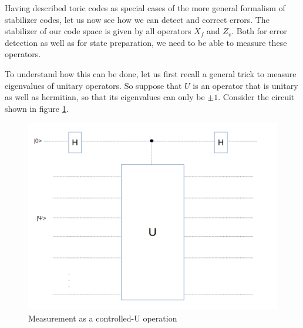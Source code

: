 \documentclass[a4paper, draft]{article}
\theoremstyle{own}
\theoremstyle{remark}
\begin{document}
Having described toric codes as special cases of the more general formalism of stabilizer codes, let us now see how we can detect and correct errors. The stabilizer of our code space is given by all operators $X_f$ and $Z_v$. Both for error detection as well as for state preparation, we need to be able to measure these operators. 

To understand how this can be done, let us first recall a general trick to measure eigenvalues of unitary operators. So suppose that $U$ is an operator that is unitary as well as hermitian, so that its eigenvalues can only be $\pm 1$. Consider the circuit shown in figure \ref{fig:ControlledUMeasurement}.

\begin{figure}[ht]
\centering
\includegraphics[width=0.7\linewidth]{images/ControlledUMeasurement}
\caption[Measurement as a controlled-U operation]{Measurement as a controlled-U operation}
\label{fig:ControlledUMeasurement}
\end{figure}
\end{document}
